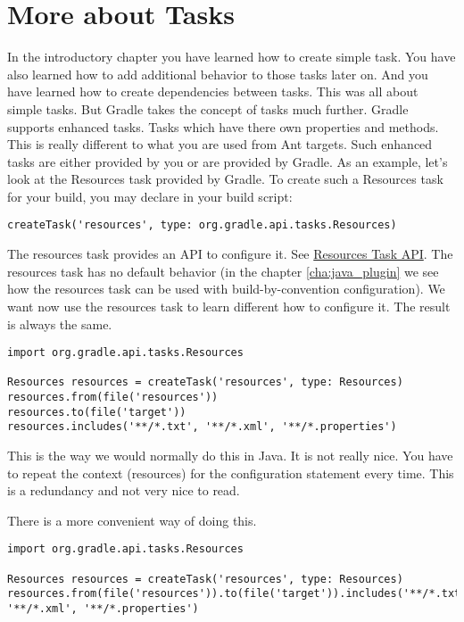 \chapter{More about Tasks} %
\label{cha:more_about_tasks}
In the introductory chapter you have learned how to create simple task. You have also learned how to add additional behavior to those tasks later on. And you have learned how to create dependencies between tasks. This was all about simple tasks. But Gradle takes the concept of tasks much further. Gradle supports enhanced tasks. Tasks which have there own properties and methods. This is really different to what you are used from Ant targets. Such enhanced tasks are either provided by you or are provided by Gradle.
As an example, let's look at the Resources task provided by Gradle. To create such a Resources task for your build, you may declare in your build script:

\begin{Verbatim}
createTask('resources', type: org.gradle.api.tasks.Resources)
\end{Verbatim}

The resources task provides an API to configure it. See \href{}{Resources Task API}. The resources task has no default behavior (in the chapter \ref{cha:java_plugin} we see how the resources task can be used with build-by-convention configuration). We want now use the resources task to learn different how to configure it. The result is always the same.

\begin{Verbatim}
import org.gradle.api.tasks.Resources

Resources resources = createTask('resources', type: Resources)
resources.from(file('resources'))
resources.to(file('target'))
resources.includes('**/*.txt', '**/*.xml', '**/*.properties')	
\end{Verbatim}

This is the way we would normally do this in Java. It is not really nice. You have to repeat the context (resources) for the configuration statement every time. This is a redundancy and not very nice to read.

There is a more convenient way of doing this.

\begin{Verbatim}
import org.gradle.api.tasks.Resources

Resources resources = createTask('resources', type: Resources)
resources.from(file('resources')).to(file('target')).includes('**/*.txt', '**/*.xml', '**/*.properties')	
\end{Verbatim}

